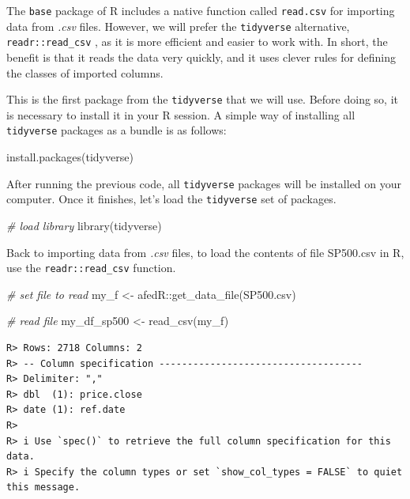 \documentclass[
  12pt,
]{book}
\newenvironment{Shaded}{\begin{snugshade}}{\end{snugshade}}
\newcommand{\CommentTok}[1]{\textcolor[rgb]{0.37,0.37,0.37}{\textit{#1}}}
\newcommand{\FunctionTok}[1]{\textcolor[rgb]{0,0,0}{#1}}
\newcommand{\NormalTok}[1]{#1}
\newcommand{\OtherTok}[1]{\textcolor[rgb]{0.37,0.37,0.37}{#1}}
\newcommand{\SpecialCharTok}[1]{\textcolor[rgb]{0,0,0}{#1}}
\newcommand{\StringTok}[1]{\textcolor[rgb]{0.5,0.5,0.5}{#1}}
\begin{document}
The \texttt{base} package of R includes a native function called \texttt{read.csv} for importing data from \emph{.csv} files. However, we will prefer the \texttt{tidyverse} alternative, \texttt{readr::read\_csv} \citep{R-readr}, as it is more efficient and easier to work with. In short, the benefit is that it reads the data very quickly, and it uses clever rules for defining the classes of imported columns.

This is the first package from the \texttt{tidyverse} that we will use. Before doing so, it is necessary to install it in your R session. A simple way of installing all \texttt{tidyverse} packages as a bundle is as follows:

\begin{Shaded}
\begin{Highlighting}[]
\FunctionTok{install.packages}\NormalTok{(}\StringTok{\textquotesingle{}tidyverse\textquotesingle{}}\NormalTok{)}
\end{Highlighting}
\end{Shaded}

After running the previous code, all \texttt{tidyverse} packages will be installed on your computer. Once it finishes, let's load the \texttt{tidyverse} set of packages.

\begin{Shaded}
\begin{Highlighting}[]
\CommentTok{\# load library}
\FunctionTok{library}\NormalTok{(tidyverse)}
\end{Highlighting}
\end{Shaded}

Back to importing data from \emph{.csv} files, to load the contents of file SP500.csv in R, use the \texttt{readr::read\_csv} function. 

\begin{Shaded}
\begin{Highlighting}[]
\CommentTok{\# set file to read}
\NormalTok{my\_f }\OtherTok{\textless{}{-}}\NormalTok{ afedR}\SpecialCharTok{::}\FunctionTok{get\_data\_file}\NormalTok{(}\StringTok{\textquotesingle{}SP500.csv\textquotesingle{}}\NormalTok{)}

\CommentTok{\# read file}
\NormalTok{my\_df\_sp500 }\OtherTok{\textless{}{-}} \FunctionTok{read\_csv}\NormalTok{(my\_f)}
\end{Highlighting}
\end{Shaded}

\begin{verbatim}
R> Rows: 2718 Columns: 2
R> -- Column specification ------------------------------------
R> Delimiter: ","
R> dbl  (1): price.close
R> date (1): ref.date
R> 
R> i Use `spec()` to retrieve the full column specification for this data.
R> i Specify the column types or set `show_col_types = FALSE` to quiet this message.
\end{verbatim}
\end{document}
